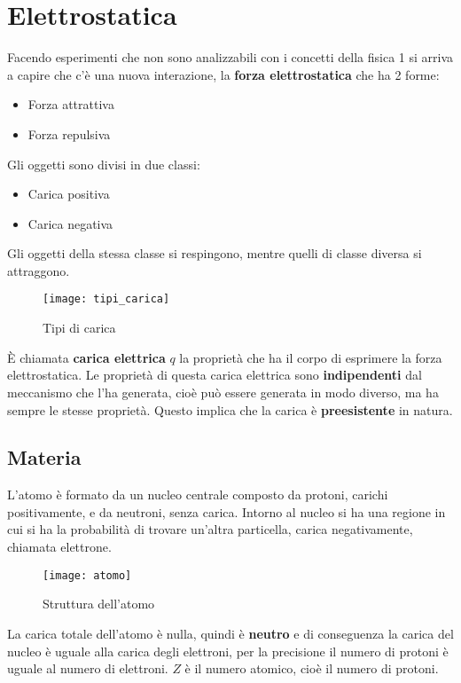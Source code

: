 \documentclass[a4paper]{article}
\begin{document}
\section{Elettrostatica}
Facendo esperimenti che non sono analizzabili con i concetti della fisica 1 si arriva
a capire che c'è una nuova interazione, la \textbf{forza elettrostatica} che ha 2 forme:
\begin{itemize}
  \item Forza attrattiva
  \item Forza repulsiva
\end{itemize}
Gli oggetti sono divisi in due classi:
\begin{itemize}
  \item Carica positiva
  \item Carica negativa
\end{itemize}
Gli oggetti della stessa classe si respingono, mentre quelli di classe diversa si attraggono.
\begin{figure}[H]
  \centering
  \texttt{[image: tipi\_carica]}
  \caption{Tipi di carica}
\end{figure}
\begin{definition}
  È chiamata \textbf{carica elettrica} \( q \) la proprietà che ha il corpo di esprimere
  la forza elettrostatica. Le proprietà di questa carica elettrica sono \textbf{indipendenti} dal
  meccanismo che l'ha generata, cioè può essere generata in modo diverso, ma ha sempre le
  stesse proprietà. Questo implica che la carica è \textbf{preesistente} in natura.
\end{definition}

\subsection{Materia}
L'atomo è formato da un nucleo centrale composto da protoni, carichi positivamente, e da
neutroni, senza carica. Intorno al nucleo si ha una regione in cui si ha la probabilità
di trovare un'altra particella, carica negativamente, chiamata elettrone.
\begin{figure}[H]
  \centering
  \texttt{[image: atomo]}
  \caption{Struttura dell'atomo}
\end{figure}
\noindent
La carica totale dell'atomo è nulla, quindi è \textbf{neutro} e
di conseguenza la carica del nucleo è uguale alla carica degli elettroni, per la precisione
il numero di protoni è uguale al numero di elettroni. \( Z \) è il numero atomico, cioè
il numero di protoni.
\end{document}
